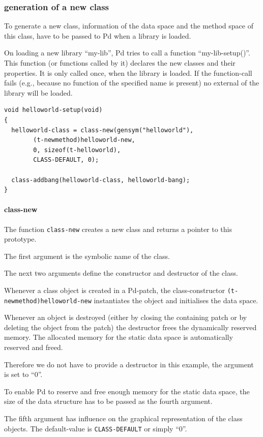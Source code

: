 \documentclass{ppgmus}
\begin{document}
\subsubsection{generation of a new class}
To generate a new class, information of the data space and the method space of this class,
have to be passed to Pd when a library is loaded.

On loading a new library ``my-lib'',
Pd tries to call a function ``my-lib-setup()''.
This function (or functions called by it) 
declares the new classes and their properties.
It is only called once, when the library is loaded.
If the function-call fails (e.g., because no function of the specified name is present)
no external of the library will be loaded.

\begin{verbatim}
void helloworld-setup(void)
{
  helloworld-class = class-new(gensym("helloworld"),
        (t-newmethod)helloworld-new,
        0, sizeof(t-helloworld),
        CLASS-DEFAULT, 0);

  class-addbang(helloworld-class, helloworld-bang);
}
\end{verbatim}

\paragraph{class-new}

The function \verb+class-new+ creates a new class and returns a pointer to this prototype.

The first argument is the symbolic name of the class.

The next two arguments define the constructor and destructor of the class.

Whenever a class object is created in a Pd-patch,
the class-constructor \verb+(t-newmethod)helloworld-new+ instantiates the object
and initialises the data space.

Whenever an object is destroyed
(either by closing the containing patch or by deleting the object from the patch)
the destructor frees the dynamically reserved memory.
The allocated memory for the static data space is automatically reserved and freed.

Therefore we do not have to provide a destructor in this example, the argument
is set to ``0''.

To enable Pd to reserve and free enough memory for the static data space,
the size of the data structure has to be passed as the fourth argument.

The fifth argument has influence on the graphical representation of the class objects.
The default-value is \verb+CLASS-DEFAULT+ or simply ``0''.
\end{document}
